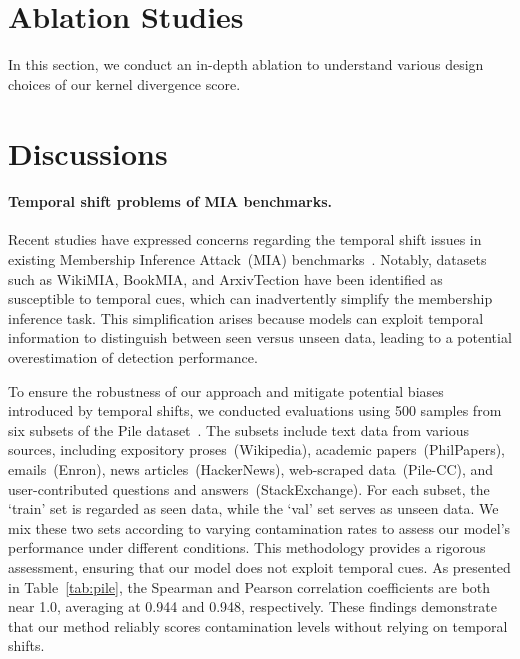 



\section{Ablation Studies}
\label{sec:analysis}



In this section, we conduct an in-depth ablation to understand various design choices of our kernel divergence score. 






\section{Discussions}
\label{sec:discussion}


\paragraph{Temporal shift problems of MIA benchmarks.}
Recent studies have expressed concerns regarding the temporal shift issues in existing Membership Inference Attack~(MIA) benchmarks~\cite{duan2024membership,das2024blind,maini2024llm}.
Notably, datasets such as WikiMIA, BookMIA, and ArxivTection have been identified as susceptible to temporal cues, which can inadvertently simplify the membership inference task.
This simplification arises because models can exploit temporal information to distinguish between seen versus unseen data, leading to a potential overestimation of detection performance.

To ensure the robustness of our approach and mitigate potential biases introduced by temporal shifts, we conducted evaluations using 500 samples from six subsets of the Pile dataset~\cite{gao2020pile}. 
The subsets include text data from various sources, including expository proses~(Wikipedia), academic papers~(PhilPapers), emails~(Enron), news articles~(HackerNews),  web-scraped data~(Pile-CC), and user-contributed questions and answers~(StackExchange).
For each subset, the `train' set is regarded as seen data, while the `val' set serves as unseen data.
We mix these two sets according to varying contamination rates to assess our model's performance under different conditions. 
This methodology provides a rigorous assessment, ensuring that our model does not exploit temporal cues. 
As presented in Table~\ref{tab:pile}, the Spearman and Pearson correlation coefficients are both near 1.0, averaging at 0.944 and 0.948, respectively. 
These findings demonstrate that our method reliably scores contamination levels without relying on temporal shifts.


